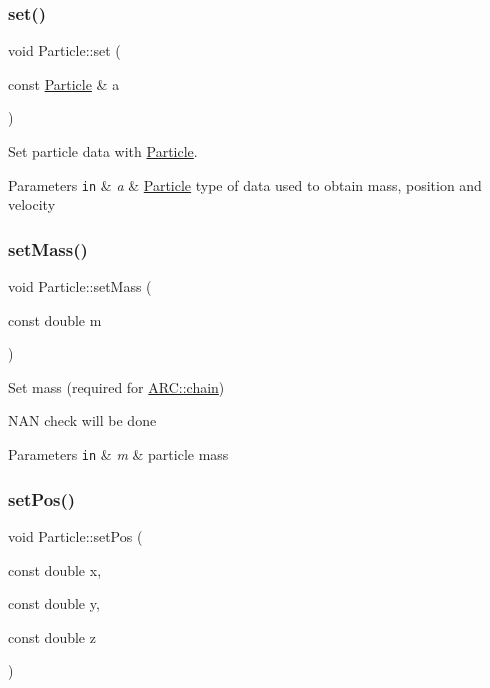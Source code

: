 \subsubsection{\texorpdfstring{set()}{set()}\hspace{0.1cm}{\footnotesize\ttfamily [3/3]}}
{\footnotesize\ttfamily void Particle\+::set (\begin{DoxyParamCaption}\item[{const \hyperlink{classParticle}{Particle} \&}]{a }\end{DoxyParamCaption})\hspace{0.3cm}{\ttfamily [inline]}}



Set particle data with \hyperlink{classParticle}{Particle}. 


\begin{DoxyParams}[1]{Parameters}
\mbox{\tt in}  & {\em a} & \hyperlink{classParticle}{Particle} type of data used to obtain mass, position and velocity \\
\hline
\end{DoxyParams}
\hypertarget{classParticle_a620f479862b90468a77da4e9cf5c0ff5}{}\label{classParticle_a620f479862b90468a77da4e9cf5c0ff5} 
\subsubsection{\texorpdfstring{set\+Mass()}{setMass()}}
{\footnotesize\ttfamily void Particle\+::set\+Mass (\begin{DoxyParamCaption}\item[{const double}]{m }\end{DoxyParamCaption})\hspace{0.3cm}{\ttfamily [inline]}}



Set mass (required for \hyperlink{classARC_1_1chain}{A\+R\+C\+::chain}) 

N\+AN check will be done 
\begin{DoxyParams}[1]{Parameters}
\mbox{\tt in}  & {\em m} & particle mass \\
\hline
\end{DoxyParams}
\hypertarget{classParticle_a97d76b66aed57834c105b78b10643b81}{}\label{classParticle_a97d76b66aed57834c105b78b10643b81} 
\subsubsection{\texorpdfstring{set\+Pos()}{setPos()}\hspace{0.1cm}{\footnotesize\ttfamily [1/2]}}
{\footnotesize\ttfamily void Particle\+::set\+Pos (\begin{DoxyParamCaption}\item[{const double}]{x,  }\item[{const double}]{y,  }\item[{const double}]{z }\end{DoxyParamCaption})\hspace{0.3cm}{\ttfamily [inline]}}



